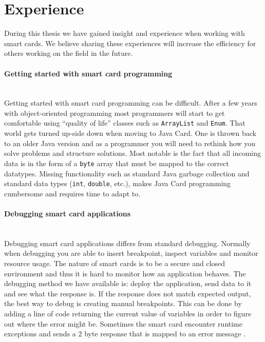 \section{Experience}
\label{sec:experience}
During this thesis we have gained insight and experience when working with smart cards. We believe sharing these experiences will increase the efficiency for others working on the field in the future.

\paragraph{Getting started with smart card programming}\mbox{}\\
Getting started with smart card programming can be difficult. After a few years with object-oriented programming most programmers will start to get comfortable using ``quality of life'' classes such as \texttt{ArrayList} and \texttt{Enum}. That world gets turned up-side down when moving to Java Card. One is  thrown back to an older Java version and as a programmer you will need to rethink how you solve problems and structure solutions. Most notable is the fact that all incoming data is in the form of a \texttt{byte} array that must be mapped to the correct datatypes. Missing functionality such as standard Java garbage collection and standard data types (\texttt{int}, \texttt{double}, etc.), makes Java Card programming cumbersome and requires time to adapt to.

\paragraph{Debugging smart card applications}\mbox{}\\
Debugging smart card applications differs from standard debugging. Normally when debugging you are able to insert breakpoint, inspect variables and monitor resource usage. The nature of smart cards is to be a secure and closed environment and thus it is hard to monitor how an application behaves. The debugging method we have available is: deploy the application, send data to it and see what the response is. If the response does not match expected output, the best way to debug is creating manual breakpoints. This can be done by adding a line of code returning the current value of variables in order to figure out where the error might be. Sometimes the smart card encounter runtime exceptions and sends a 2 byte response that is mapped to an error message \cite{javacardErrors}.

